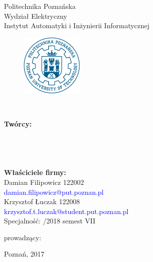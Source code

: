 \thispagestyle{empty}
\begin{center}
Politechnika Poznańska\\
Wydział Elektryczny\\  
Instytut Automatyki i Inżynierii Informatycznej\\
\begin{figure}[ht!]
\centering
\includegraphics[width=30mm]{pplogo.png}
\end{figure}
  \LARGE{\TytulPolski}\\ 
   \vspace{5mm}
\end{center}
   \begin{flushright}
   \normalsize\textbf {Twórcy:}\\
\large{\StudentA} \large{\AlbumA}\\
\textcolor{blue}{\large{\EmailA}}\\
\large{\StudentB} \large{\AlbumB}\\
\textcolor{blue}{\large{\EmailB}}\\

\vspace{5mm}
\normalsize\textbf {Właściciele firmy:}\\
\large{Damian Filipowicz} \large{122002}\\
\textcolor{blue}{\large{damian.filipowicz@put.poznan.pl}}\\
\large{Krzysztof Łuczak} \large{122008}\\
\textcolor{blue}{\large{krzysztof.t.luczak@student.put.poznan.pl}}\\
\vspace{3mm}
\large{Specjalność: /2018 semest VII}



prowadzący:\\
\Prowadzacy
\end{flushright}

\begin{center}
Poznań, 2017
\end{center}